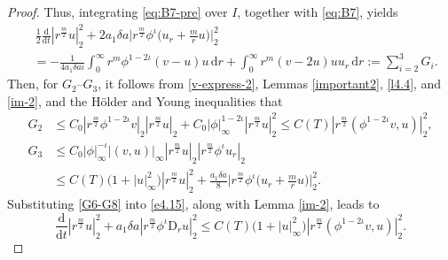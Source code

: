 \documentclass[11pt,reqno]{amsart}
\numberwithin{rk}{section}
\numberwithin{prop}{section}
\numberwithin{mydef}{section}
\numberwithin{lem}{section}
\numberwithin{equation}{section}
\numberwithin{thm}{section}
\begin{document}
\begin{proof}
Thus, integrating \eqref{eq:B7-pre} over $I$, together with \eqref{eq:B7}, yields
\begin{equation}\label{e4.15}
\begin{aligned}
&\,\frac{1}{2}\frac{\mathrm{d}}{\mathrm{d}t} |r^{\frac{m}{2}}u|_2^2 + 2a_1\delta a\Big|r^{\frac{m}{2}}\phi^\iota \big(u_r+\frac{m}{r}u\big)\Big|_2^2\\
&= -\frac{1}{4a_1\delta a \iota}\int_0^\infty r^m \phi^{1-2\iota}(v-u)u\,\mathrm{d}r + \int_0^\infty r^m (v-2u)uu_r\,\mathrm{d}r:=\sum_{i=2}^{3} G_i.
\end{aligned}
\end{equation}
Then, for $G_2$--$G_3$, it follows from \eqref{v-express-2}, Lemmas \ref{important2}, \ref{l4.4}, and \ref{im-2}, 
and the H\"older and Young inequalities that
\begin{equation}\label{G6-G8}   
\begin{aligned}
G_2&\leq  C_0 |r^\frac{m}{2}\phi^{1-2\iota} v|_{2} |r^{\frac{m}{2}}u|_{2} +C_0|\phi|_{\infty}^{1-2\iota} |r^{\frac{m}{2}}u|_{2}^2 \leq  C(T)|r^\frac{m}{2}(\phi^{1-2\iota} v,u)|_2^2,\\
G_3&\leq C_0|\phi|_\infty^{-\iota}|(v,u)|_{\infty}|r^{\frac{m}{2}}u|_{2} |r^{\frac{m}{2}}\phi^\iota u_r|_{2} \\
&\leq  C(T)\big(1+|u|_\infty^2\big)|r^{\frac{m}{2}}u|_{2}^2+\frac{a_1\delta a}{8}\Big|r^{\frac{m}{2}}\phi^\iota\big(u_r+\frac{m}{r}u\big)\Big|_2^2.
\end{aligned}
\end{equation}
Substituting \eqref{G6-G8} into \eqref{e4.15}, along with Lemma \ref{im-2}, leads to
\begin{equation}\label{eq4.16}
\frac{\mathrm{d}}{\mathrm{d}t} |r^{\frac{m}{2}}u|_2^2 + a_1\delta a |r^{\frac{m}{2}}\phi^\iota \mathrm{D}_r u|_2^2 \leq C(T)\big(1+|u|_\infty^2\big) |r^\frac{m}{2}(\phi^{1-2\iota} v,u)|_2^2.
\end{equation}


\end{proof}
\end{document}
